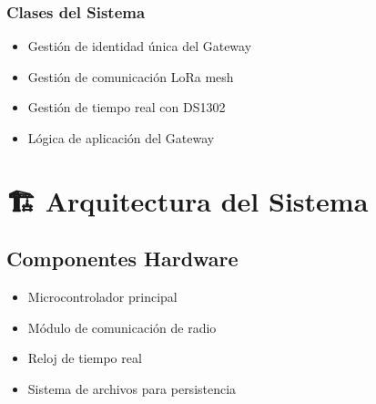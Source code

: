 \documentclass[a4paper,11pt,spanish]{sphinxmanual}
\begin{document}
\subsection{Clases del Sistema}
\label{\detokenize{index:clases-del-sistema}}\begin{itemize}
\item {} 
\sphinxAtStartPar
{} \sphinxhyphen{} Gestión de identidad única del Gateway

\item {} 
\sphinxAtStartPar
{} \sphinxhyphen{} Gestión de comunicación LoRa mesh

\item {} 
\sphinxAtStartPar
{} \sphinxhyphen{} Gestión de tiempo real con DS1302

\item {} 
\sphinxAtStartPar
{} \sphinxhyphen{} Lógica de aplicación del Gateway

\end{itemize}


\chapter{🏗️ Arquitectura del Sistema}
\label{\detokenize{index:arquitectura-del-sistema}}

\section{Componentes Hardware}
\label{\detokenize{index:componentes-hardware}}\begin{itemize}
\item {} 
\sphinxAtStartPar
{} Microcontrolador principal

\item {} 
\sphinxAtStartPar
{} Módulo de comunicación de radio

\item {} 
\sphinxAtStartPar
{} Reloj de tiempo real

\item {} 
\sphinxAtStartPar
{} Sistema de archivos para persistencia

\end{itemize}
\end{document}
